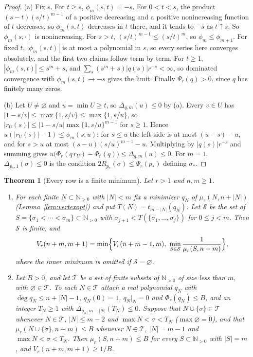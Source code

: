 \documentclass[11pt]{article}
\newtheorem{theorem}{Theorem}[section]
\newcommand{\N}{\mathbb N}
\begin{document}
\begin{proof}
(a) Fix $s$.  For $t\ge s$, $\phi_m(s,t)=-s$.  For $0<t<s$, the product
$(s-t)(s/t)^{m-1}$ of a positive decreasing and a positive nonincreasing
function of $t$ decreases, so $\phi_m(s,t)$ decreases in $t$ there, and it
tends to $-s$ as $t\uparrow s$.  So $\phi_m(s,\cdot)$ is nonincreasing.  For
$s>t$, $(s/t)^{m-1}\le(s/t)^m$, so $\phi_m\le\phi_{m+1}$.  For fixed $t$,
$|\phi_m(s,t)|$ is at most a polynomial in $s$, so every series here
converges absolutely, and the first two claims follow term by term.  For
$t\ge1$, $|\phi_m(s,t)|\le s^m+s$, and $\sum_s(s^m+s)|q(s)|r^{-s}<\infty$, so
dominated convergence with $\phi_m(s,t)\to-s$ gives the limit.  Finally
$\Psi_r(q)>0$, since $q$ has finitely many zeros.

(b) Let $U\ne\varnothing$ and $u=\min U\ge t$, so $\Delta_{q,m}(u)\le0$ by
(a).  Every $v\in U$ has $|1-s/v|\le\max\{1,s/v\}\le\max\{1,s/u\}$, so
$|r_U(s)|\le|1-s/u|\max\{1,s/u\}^{m-1}$ for $s\ge1$.  Hence
$u(|r_U(s)|-1)\le\phi_m(s,u)$: for $s\le u$ the left side is at most
$(u-s)-u$, and for $s>u$ at most $(s-u)(s/u)^{m-1}-u$.  Multiplying by
$|q(s)|r^{-s}$ and summing gives
$u\bigl(\Phi_r(q\,r_U)-\Phi_r(q)\bigr)\le\Delta_{q,m}(u)\le0$.  For $m=1$,
$\Delta_{p_*,1}(\sigma)\le0$ is the condition $2R_{p_*}(\sigma)\le\Psi_r(p_*)$
defining $\sigma_*$.
\end{proof}

\begin{theorem}[Every row is a finite minimum]\label{thm:finiterows}
Let $r>1$ and $n,m\ge1$.
\begin{enumerate}
\item[(a)] For each finite $N\subset\N_{>0}$ with $|N|<m$ fix a minimizer
$q_N$ of $\mu_r(N,n+|N|)$ (Lemma~\ref{lem:vertexopt}) and put
$T(N)=t_{m-|N|}(q_N)$.  Let $\mathcal S$ be the set of
$S=\{\sigma_1<\cdots<\sigma_m\}\subset\N_{>0}$ with
$\sigma_{j+1}<T(\{\sigma_1,\ldots,\sigma_j\})$ for $0\le j<m$.  Then
$\mathcal S$ is finite, and
\[
  V_r(n+m,m+1)=\min\Bigl\{V_r(n+m-1,m),\
  \min_{S\in\mathcal S}\frac1{\mu_r(S,n+m)}\Bigr\},
\]
where the inner minimum is omitted if $\mathcal S=\varnothing$.
\item[(b)] Let $B>0$, and let $\mathcal T$ be a set of finite subsets of
$\N_{>0}$ of size less than $m$, with $\varnothing\in\mathcal T$.  To each
$N\in\mathcal T$ attach a real polynomial $q_N$ with $\deg q_N\le n+|N|-1$,
$q_N(0)=1$, $q_N|_N=0$ and $\Phi_r(q_N)\le B$, and an integer $T_N\ge1$ with
$\Delta_{q_N,m-|N|}(T_N)\le0$.  Suppose that $N\cup\{\sigma\}\in\mathcal T$
whenever $N\in\mathcal T$, $|N|\le m-2$ and $\max N<\sigma<T_N$
($\max\varnothing=0$), and that $\mu_r(N\cup\{\sigma\},n+m)\le B$ whenever
$N\in\mathcal T$, $|N|=m-1$ and $\max N<\sigma<T_N$.  Then
$\mu_r(S,n+m)\le B$ for every $S\subset\N_{>0}$ with $|S|=m$, and
$V_r(n+m,m+1)\ge1/B$.
\end{enumerate}
\end{theorem}
\end{document}
